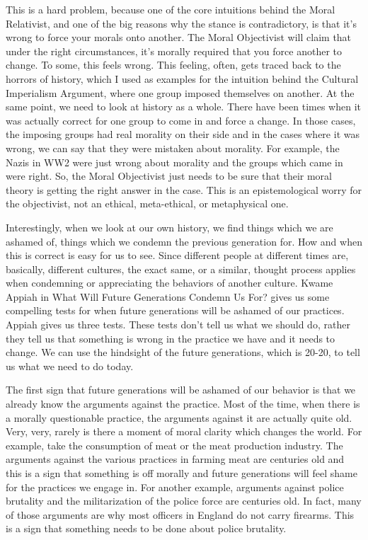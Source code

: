 This is a hard problem, because one of the core intuitions behind the Moral Relativist, and one of the big reasons why the stance is contradictory, is that it’s wrong to force your morals onto another. The Moral Objectivist will claim that under the right circumstances, it’s morally required that you force another to change. To some, this feels wrong. This feeling, often, gets traced back to the horrors of history, which I used as examples for the intuition behind the Cultural Imperialism Argument, where one group imposed themselves on another. At the same point, we need to look at history as a whole. There have been times when it was actually correct for one group to come in and force a change. In those cases, the imposing groups had real morality on their side and in the cases where it was wrong, we can say that they were mistaken about morality. For example, the Nazis in WW2 were just wrong about morality and the groups which came in were right. So, the Moral Objectivist just needs to be sure that their moral theory is getting the right answer in the case. This is an epistemological worry for the objectivist, not an ethical, meta-ethical, or metaphysical one. 

Interestingly, when we look at our own history, we find things which we are ashamed of, things which we condemn the previous generation for. How and when this is correct is easy for us to see. Since different people at different times are, basically, different cultures, the exact same, or a similar, thought process applies when condemning or appreciating the behaviors of another culture. Kwame Appiah in What Will Future Generations Condemn Us For? gives us some compelling tests for when future generations will be ashamed of our practices. Appiah gives us three tests. These tests don't tell us what we should do, rather they tell us that something is wrong in the practice we have and it needs to change. We can use the hindsight of the future generations, which is 20-20, to tell us what we need to do today.\autocite{Appiah1} 

The first sign that future generations will be ashamed of our behavior is that we already know the arguments against the practice. Most of the time, when there is a morally questionable practice, the arguments against it are actually quite old. Very, very, rarely is there a moment of moral clarity which changes the world. For example, take the consumption of meat or the meat production industry. The arguments against the various practices in farming meat are centuries old and this is a sign that something is off morally and future generations will feel shame for the practices we engage in. For another example, arguments against police brutality and the militarization of the police force are centuries old. In fact, many of those arguments are why most officers in England do not carry firearms. This is a sign that something needs to be done about police brutality. 

